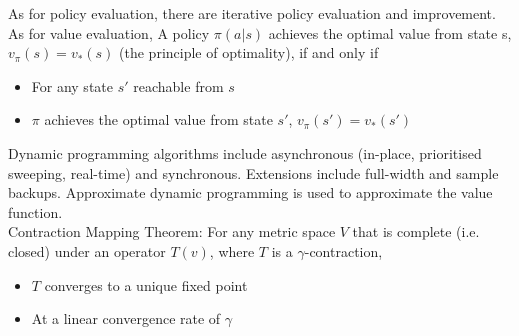 \documentclass[10pt,twocolumn,letterpaper]{article}
\begin{document}
	As for policy evaluation, there are iterative policy evaluation and improvement. 
	As for value evaluation, A policy $\pi (a|s)$ achieves the optimal value from state s, $v_\pi (s) = v_\ast(s)$ (the principle of optimality), if and only if
	\begin{itemize}
		\item For any state $s'$ reachable from $s$
		\item $\pi$ achieves the optimal value from state $s'$, $v_\pi (s') = v_\ast (s')$	 
	\end{itemize}
	Dynamic programming algorithms include asynchronous (in-place, prioritised sweeping, real-time) and synchronous. Extensions include full-width and sample backups. Approximate dynamic programming is used to approximate the value function.\\
	Contraction Mapping Theorem:
	For any metric space $V$ that is complete (i.e. closed) under an
	operator $T(v)$, where $T$ is a $\gamma$-contraction,
	\begin{itemize}
		\item $T$ converges to a unique fixed point
		\item At a linear convergence rate of 
		$\gamma$
	\end{itemize}
	
\end{document}
